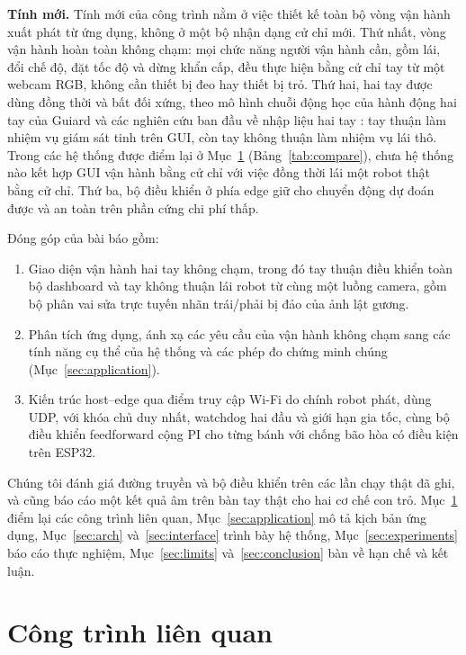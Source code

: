 \documentclass[5p,twocolumn]{elsarticle}
\begin{document}
\textbf{Tính mới.} Tính mới của công trình nằm ở việc thiết kế toàn bộ vòng vận hành xuất phát từ ứng dụng, không ở một bộ nhận dạng cử chỉ mới. Thứ nhất, vòng vận hành hoàn toàn không chạm: mọi chức năng người vận hành cần, gồm lái, đổi chế độ, đặt tốc độ và dừng khẩn cấp, đều thực hiện bằng cử chỉ tay từ một webcam RGB, không cần thiết bị đeo hay thiết bị trỏ. Thứ hai, hai tay được dùng đồng thời và bất đối xứng, theo mô hình chuỗi động học của hành động hai tay của Guiard \cite{guiard1987} và các nghiên cứu ban đầu về nhập liệu hai tay \cite{buxton1986}: tay thuận làm nhiệm vụ giám sát tinh trên GUI, còn tay không thuận làm nhiệm vụ lái thô. Trong các hệ thống được điểm lại ở Mục~\ref{sec:related} (Bảng~\ref{tab:compare}), chưa hệ thống nào kết hợp GUI vận hành bằng cử chỉ với việc đồng thời lái một robot thật bằng cử chỉ. Thứ ba, bộ điều khiển ở phía edge giữ cho chuyển động dự đoán được và an toàn trên phần cứng chi phí thấp.

Đóng góp của bài báo gồm:
\begin{enumerate}
  \item Giao diện vận hành hai tay không chạm, trong đó tay thuận điều khiển toàn bộ dashboard và tay không thuận lái robot từ cùng một luồng camera, gồm bộ phân vai sửa trực tuyến nhãn trái/phải bị đảo của ảnh lật gương.
  \item Phân tích ứng dụng, ánh xạ các yêu cầu của vận hành không chạm sang các tính năng cụ thể của hệ thống và các phép đo chứng minh chúng (Mục~\ref{sec:application}).
  \item Kiến trúc host--edge qua điểm truy cập Wi-Fi do chính robot phát, dùng UDP, với khóa chủ duy nhất, watchdog hai đầu và giới hạn gia tốc, cùng bộ điều khiển feedforward cộng PI cho từng bánh với chống bão hòa có điều kiện trên ESP32.
\end{enumerate}
Chúng tôi đánh giá đường truyền và bộ điều khiển trên các lần chạy thật đã ghi, và cũng báo cáo một kết quả âm trên bàn tay thật cho hai cơ chế con trỏ. Mục~\ref{sec:related} điểm lại các công trình liên quan, Mục~\ref{sec:application} mô tả kịch bản ứng dụng, Mục~\ref{sec:arch} và~\ref{sec:interface} trình bày hệ thống, Mục~\ref{sec:experiments} báo cáo thực nghiệm, Mục~\ref{sec:limits} và~\ref{sec:conclusion} bàn về hạn chế và kết luận.

\section{Công trình liên quan}\label{sec:related}
\end{document}
